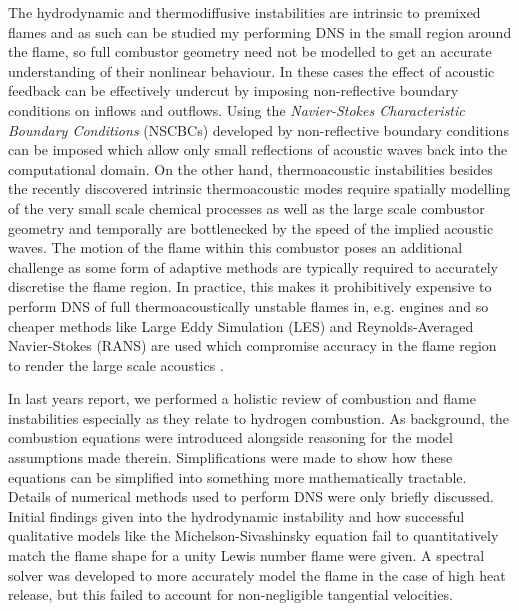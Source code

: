 The hydrodynamic and thermodiffusive instabilities are intrinsic to premixed flames and as such can be studied my performing DNS in the small region around the flame, so full combustor geometry need not be modelled to get an accurate understanding of their nonlinear behaviour. In these cases the effect of acoustic feedback can be effectively undercut by imposing non-reflective boundary conditions on inflows and outflows. Using the \emph{Navier-Stokes Characteristic Boundary Conditions} (NSCBCs) developed by \cite{thompson1990TimeDependentBoundaryConditions, poinsot1992BoundaryConditionsDirect, poinsot2001TheoreticalNumericalCombustion, sutherland2003ImprovedBoundaryConditions} non-reflective boundary conditions can be imposed which allow only small reflections of acoustic waves back into the computational domain. On the other hand, thermoacoustic instabilities besides the recently discovered intrinsic thermoacoustic modes \cite{silva2023IntrinsicThermoacousticInstabilities} require spatially modelling of the very small scale chemical processes as well as the large scale combustor geometry and temporally are bottlenecked by the speed of the implied acoustic waves. The motion of the flame within this combustor poses an additional challenge as some form of adaptive methods are typically required to accurately discretise the flame region. In practice, this makes it prohibitively expensive to perform DNS of full thermoacoustically unstable flames in, e.g. engines and so cheaper methods like Large Eddy Simulation (LES) and Reynolds-Averaged Navier-Stokes (RANS) are used which compromise accuracy in the flame region to render the large scale acoustics \cite{yang2015LargeEddySimulationPresent, domingo2023RecentDevelopmentsDNS}.

In last years report, we performed a holistic review of combustion and flame instabilities especially as they relate to hydrogen combustion. As background, the combustion equations were introduced alongside reasoning for the model assumptions made therein. Simplifications were made to show how these equations can be simplified into something more mathematically tractable. Details of numerical methods used to perform DNS were only briefly discussed. Initial findings given into the hydrodynamic instability and how successful qualitative models like the Michelson-Sivashinsky equation \cite{sivashinsky1977NonlinearAnalysisHydrodynamic, michelson1977NonlinearAnalysisHydrodynamic} fail to quantitatively match the flame shape for a unity Lewis number flame were given. A spectral solver was developed to more accurately model the flame in the case of high heat release, but this failed to account for non-negligible tangential velocities.

